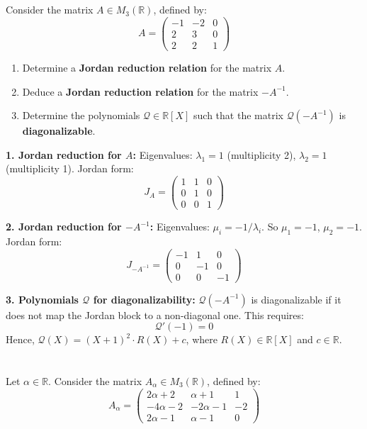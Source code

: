 \documentclass[12pt]{article}
\begin{document}
\section{}
Consider the matrix $A\in M_{3}(\mathbb{R})$, defined by: 
$$A = 
\begin{pmatrix}
-1 & -2 & 0 \\ 
2 & 3 & 0 \\ 
2 & 2 & 1 
\end{pmatrix}$$ 

\begin{enumerate}
\item Determine a \textbf{Jordan reduction relation} for the matrix $A$. 
\item Deduce a \textbf{Jordan reduction relation} for the matrix $-A^{-1}$. 
\item Determine the polynomials $\mathcal{Q}\in\mathbb{R}[X]$ such that the matrix $\mathcal{Q}(-A^{-1})$ is \textbf{diagonalizable}. 
\end{enumerate}

\begin{answerbox}
\textbf{1. Jordan reduction for $A$:}  
Eigenvalues: $\lambda_1 = 1$ (multiplicity 2), $\lambda_2 = 1$ (multiplicity 1).  
Jordan form:  
\[
J_A = 
\begin{pmatrix}
1 & 1 & 0 \\
0 & 1 & 0 \\
0 & 0 & 1
\end{pmatrix}
\]

\textbf{2. Jordan reduction for $-A^{-1}$:}  
Eigenvalues: $\mu_i = -1/\lambda_i$. So $\mu_1 = -1$, $\mu_2 = -1$.  
Jordan form:  
\[
J_{-A^{-1}} = 
\begin{pmatrix}
-1 & 1 & 0 \\
0 & -1 & 0 \\
0 & 0 & -1
\end{pmatrix}
\]

\textbf{3. Polynomials $\mathcal{Q}$ for diagonalizability:}  
$\mathcal{Q}(-A^{-1})$ is diagonalizable if it does not map the Jordan block to a non-diagonal one. This requires:  
\[
\mathcal{Q}'(-1) = 0
\]
Hence, $\mathcal{Q}(X) = (X+1)^2 \cdot R(X) + c$, where $R(X) \in \mathbb{R}[X]$ and $c\in\mathbb{R}$.
\end{answerbox}

\section{}
Let $\alpha \in \mathbb{R}$. Consider the matrix $A_{\alpha} \in M_{3}(\mathbb{R})$, defined by:
$$A_{\alpha} = \begin{pmatrix} 2\alpha + 2 & \alpha + 1 & 1 \\ -4\alpha - 2 & -2\alpha - 1 & -2 \\ 2\alpha - 1 & \alpha - 1 & 0 \end{pmatrix}$$
\end{document}
